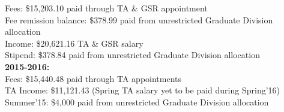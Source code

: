 \documentclass[margin, 10pt]{res} %
\begin{document}
\begin{resume}
Fees: \$15,203.10 paid through TA \& GSR appointment \\
Fee remission balance: \$378.99 paid from unrestricted Graduate Division allocation  \\
Income: \$20,621.16 TA \& GSR salary \\
Stipend: \$378.84 paid from unrestricted Graduate Division allocation \\
  
  
\textbf{2015-2016:} \\

Fees: \$15,440.48 paid through TA appointments \\
TA Income: \$11,121.43 (Spring TA salary yet to be paid during Spring'16) \\
Summer'15: \$4,000 paid from unrestricted Graduate Division allocation \\




\end{resume}
\end{document}
